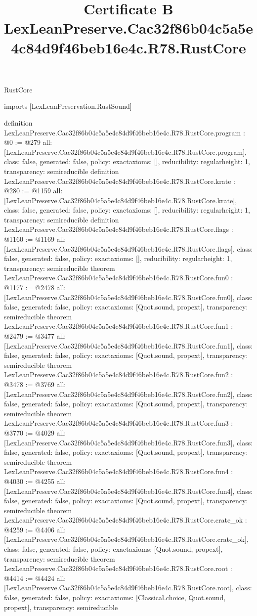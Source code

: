 \begin{lexlean}{RustCore}
\title{Certificate B LexLeanPreserve.Cac32f86b04c5a5e4c84d9f46beb16e4c.R78.RustCore}
\begin{coremodule}
imports [LexLeanPreservation.RustSound]

definition LexLeanPreserve.Cac32f86b04c5a5e4c84d9f46beb16e4c.R78.RustCore.program : @0 := @279 {
  all: [LexLeanPreserve.Cac32f86b04c5a5e4c84d9f46beb16e4c.R78.RustCore.program],
  class: false,
  generated: false,
  policy: exact{axioms: []},
  reducibility: regular{height: 1},
  transparency: semireducible
}
definition LexLeanPreserve.Cac32f86b04c5a5e4c84d9f46beb16e4c.R78.RustCore.krate : @280 := @1159 {
  all: [LexLeanPreserve.Cac32f86b04c5a5e4c84d9f46beb16e4c.R78.RustCore.krate],
  class: false,
  generated: false,
  policy: exact{axioms: []},
  reducibility: regular{height: 1},
  transparency: semireducible
}
definition LexLeanPreserve.Cac32f86b04c5a5e4c84d9f46beb16e4c.R78.RustCore.flags : @1160 := @1169 {
  all: [LexLeanPreserve.Cac32f86b04c5a5e4c84d9f46beb16e4c.R78.RustCore.flags],
  class: false,
  generated: false,
  policy: exact{axioms: []},
  reducibility: regular{height: 1},
  transparency: semireducible
}
theorem LexLeanPreserve.Cac32f86b04c5a5e4c84d9f46beb16e4c.R78.RustCore.fun0 : @1177 := @2478 {
  all: [LexLeanPreserve.Cac32f86b04c5a5e4c84d9f46beb16e4c.R78.RustCore.fun0],
  class: false,
  generated: false,
  policy: exact{axioms: [Quot.sound, propext]},
  transparency: semireducible
}
theorem LexLeanPreserve.Cac32f86b04c5a5e4c84d9f46beb16e4c.R78.RustCore.fun1 : @2479 := @3477 {
  all: [LexLeanPreserve.Cac32f86b04c5a5e4c84d9f46beb16e4c.R78.RustCore.fun1],
  class: false,
  generated: false,
  policy: exact{axioms: [Quot.sound, propext]},
  transparency: semireducible
}
theorem LexLeanPreserve.Cac32f86b04c5a5e4c84d9f46beb16e4c.R78.RustCore.fun2 : @3478 := @3769 {
  all: [LexLeanPreserve.Cac32f86b04c5a5e4c84d9f46beb16e4c.R78.RustCore.fun2],
  class: false,
  generated: false,
  policy: exact{axioms: [Quot.sound, propext]},
  transparency: semireducible
}
theorem LexLeanPreserve.Cac32f86b04c5a5e4c84d9f46beb16e4c.R78.RustCore.fun3 : @3770 := @4029 {
  all: [LexLeanPreserve.Cac32f86b04c5a5e4c84d9f46beb16e4c.R78.RustCore.fun3],
  class: false,
  generated: false,
  policy: exact{axioms: [Quot.sound, propext]},
  transparency: semireducible
}
theorem LexLeanPreserve.Cac32f86b04c5a5e4c84d9f46beb16e4c.R78.RustCore.fun4 : @4030 := @4255 {
  all: [LexLeanPreserve.Cac32f86b04c5a5e4c84d9f46beb16e4c.R78.RustCore.fun4],
  class: false,
  generated: false,
  policy: exact{axioms: [Quot.sound, propext]},
  transparency: semireducible
}
theorem LexLeanPreserve.Cac32f86b04c5a5e4c84d9f46beb16e4c.R78.RustCore.crate_ok : @4259 := @4406 {
  all: [LexLeanPreserve.Cac32f86b04c5a5e4c84d9f46beb16e4c.R78.RustCore.crate_ok],
  class: false,
  generated: false,
  policy: exact{axioms: [Quot.sound, propext]},
  transparency: semireducible
}
theorem LexLeanPreserve.Cac32f86b04c5a5e4c84d9f46beb16e4c.R78.RustCore.root : @4414 := @4424 {
  all: [LexLeanPreserve.Cac32f86b04c5a5e4c84d9f46beb16e4c.R78.RustCore.root],
  class: false,
  generated: false,
  policy: exact{axioms: [Classical.choice, Quot.sound, propext]},
  transparency: semireducible
}


\end{coremodule}
\end{lexlean}
